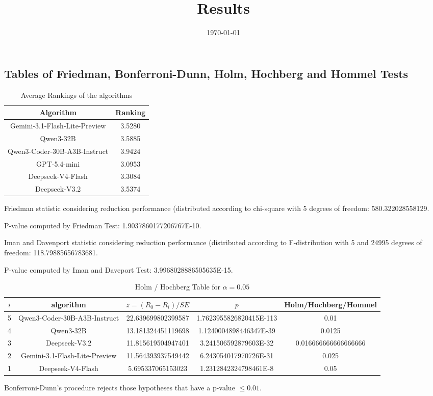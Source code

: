 \documentclass[a4paper,10pt]{article}
\title{Results}
\date{\today}
\begin{document}
\begin{landscape}
\oddsidemargin 0in \topmargin 0in\maketitle
\section{Tables of Friedman, Bonferroni-Dunn, Holm, Hochberg and Hommel Tests}
\begin{table}[!htp]
\centering
\caption{Average Rankings of the algorithms
}\begin{tabular}{c|c}
Algorithm&Ranking\\
\hline
Gemini-3.1-Flash-Lite-Preview&3.5280\\
Qwen3-32B&3.5885\\
Qwen3-Coder-30B-A3B-Instruct&3.9424\\
GPT-5.4-mini&3.0953\\
Deepseek-V4-Flash&3.3084\\
Deepseek-V3.2&3.5374\\
\end{tabular}
\end{table}


Friedman statistic considering reduction performance (distributed according to chi-square with 5 degrees of freedom: 580.322028558129.


P-value computed by Friedman Test: 1.9037860177206767E-10.\newline

Iman and Davenport statistic considering reduction performance (distributed according to F-distribution with 5 and 24995 degrees of freedom: 118.79885656783681.


P-value computed by Iman and Daveport Test: 3.9968028886505635E-15.\newline

\begin{table}[!htp]
\centering\tiny
\caption{Holm / Hochberg Table for $\alpha=0.05$}
\begin{tabular}{ccccc}
$i$&algorithm&$z=(R_0 - R_i)/SE$&$p$&Holm/Hochberg/Hommel\\
\hline
5&Qwen3-Coder-30B-A3B-Instruct&22.639699802399587&1.7623955826820415E-113&0.01\\
4&Qwen3-32B&13.181324451119698&1.1240004898446347E-39&0.0125\\
3&Deepseek-V3.2&11.815619504947401&3.241506592879603E-32&0.016666666666666666\\
2&Gemini-3.1-Flash-Lite-Preview&11.564393937549442&6.243054017970726E-31&0.025\\
1&Deepseek-V4-Flash&5.695337065153023&1.2312842324798461E-8&0.05\\
\hline
\end{tabular}
\end{table}
Bonferroni-Dunn's procedure rejects those hypotheses that have a p-value $\le0.01$.



\end{landscape}
\end{document}
